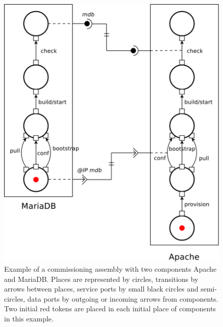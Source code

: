 \begin{figure}[tbp]
  \begin{center}
    \includegraphics[width=0.7\linewidth]{./images/apachebdd.pdf}
  \end{center}
  \caption{Example of a commissioning assembly with two components
    Apache and MariaDB. Places are represented by circles, transitions
    by arrows between places, service ports by small black circles and
    semi-circles, data ports by outgoing or incoming arrows from
    components. Two initial red tokens are placed in each initial
    place of components in this example.}
  \label{fig:example}
\end{figure}


